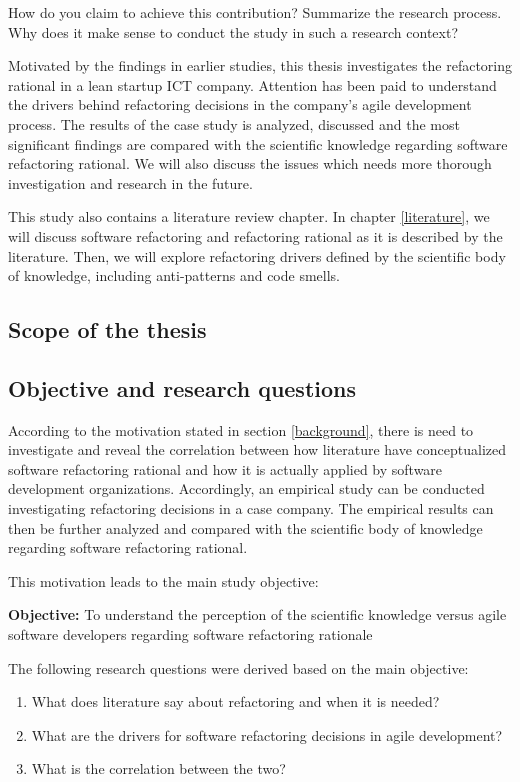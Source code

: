 \documentclass[english,12pt,a4paper,pdftex,sci,utf8]{aaltothesis}
\begin{document}
How do you claim to achieve this contribution? Summarize the research process. Why does it make sense to conduct the study in such a research context? 

Motivated by the findings in earlier studies, this thesis investigates the refactoring rational in a lean startup ICT company. Attention has been paid to understand the drivers behind refactoring decisions in the company's agile development process. The results of the case study is analyzed, discussed and the most significant findings are compared with the scientific knowledge regarding software refactoring rational. We will also discuss the issues which needs more thorough investigation and research in the future.

This study also contains a literature review chapter. In chapter \ref{literature}, we will discuss software refactoring and refactoring rational as it is described by the literature. Then, we will explore refactoring drivers defined by the scientific body of knowledge, including anti-patterns and code smells.

\subsection{Scope of the thesis} \label{scope}

\subsection{Objective and research questions} \label{questions}
According to the motivation stated in section \ref{background}, there is need to investigate and reveal the correlation between how literature have conceptualized software refactoring rational and how it is actually applied by software development organizations. Accordingly, an empirical study can be conducted investigating refactoring decisions in a case company. The empirical results can then be further analyzed and compared with the scientific body of knowledge regarding software refactoring rational. 

This motivation leads to the main study objective:

\textbf{Objective:} To understand the perception of the scientific knowledge versus agile software developers regarding software refactoring rationale

The following research questions were derived based on the main objective:

\begin{enumerate}[label=\textbf{RQ\arabic*}]
\item What does literature say about refactoring and when it is needed?
\item What are the drivers for software refactoring decisions in agile development?
\item What is the correlation between the two?
\end{enumerate}
\end{document}
